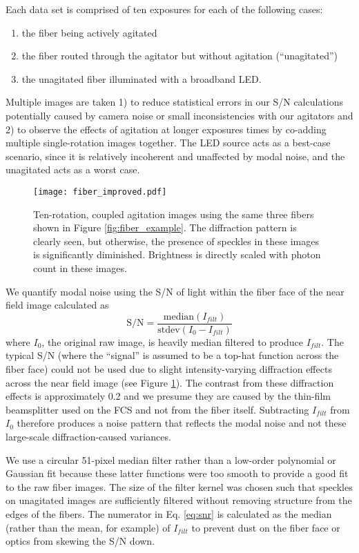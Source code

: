 \documentclass[twocolumn]{emulateapj}
\begin{document}
Each data set is comprised of ten exposures for each of the following cases:
\begin{enumerate}
\item the fiber being actively agitated
\item the fiber routed through the agitator but without agitation (``unagitated'')
\item the unagitated fiber illuminated with a broadband LED.
\end{enumerate}
Multiple images are taken 1) to reduce statistical errors in our S/N calculations potentially caused by camera noise or small inconsistencies with our agitators and 2) to observe the effects of agitation at longer exposures times by co-adding multiple single-rotation images together. The LED source acts as a best-case scenario, since it is relatively incoherent and unaffected by modal noise, and the unagitated acts as a worst case.

\begin{figure}
\centering
	\texttt{[image: fiber\_improved.pdf]}
	\caption{Ten-rotation, coupled agitation images using the same three fibers shown in Figure \ref{fig:fiber_example}.  The diffraction pattern is clearly seen, but otherwise, the presence of speckles in these images is significantly diminished. Brightness is directly scaled with photon count in these images.}
\label{fig:fiber_improved}
\end{figure}

We quantify modal noise using the S/N of light within the fiber face of the near field image calculated as
\begin{equation}
\mathrm{S/N} = \frac{\mathrm{median}(I_{filt})}{\mathrm{stdev}(I_0 - I_{filt})}
\label{eq:snr}
\end{equation}
where $I_0$, the original raw image, is heavily median filtered to produce $I_{filt}$. The typical S/N (where the ``signal'' is assumed to be a top-hat function across the fiber face) could not be used due to slight intensity-varying diffraction effects across the near field image (see Figure \ref{fig:fiber_improved}). The contrast from these diffraction effects is approximately 0.2 and we presume they are caused by the thin-film beamsplitter used on the FCS and not from the fiber itself. Subtracting $I_{filt}$ from $I_0$ therefore produces a noise pattern that reflects the modal noise and not these large-scale diffraction-caused variances.

We use a circular 51-pixel median filter rather than a low-order polynomial or Gaussian fit because these latter functions were too smooth to provide a good fit to the raw fiber images. The size of the filter kernel was chosen such that speckles on unagitated images are sufficiently filtered without removing structure from the edges of the fibers. The numerator in Eq. \ref{eq:snr} is calculated as the median (rather than the mean, for example) of $I_{filt}$ to prevent dust on the fiber face or optics from skewing the S/N down.
\end{document}
